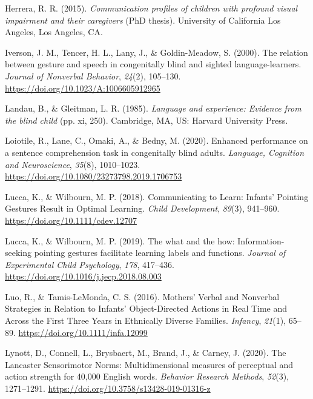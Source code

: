 \documentclass[
  man,floatsintext]{apa6}
\newlength{\cslhangindent}
\newlength{\cslentryspacingunit} %
\newenvironment{CSLReferences}[2] %
 {%
  \setlength{\parindent}{0pt}
  \ifodd #1
  \let\oldpar\par
  \def\par{\hangindent=\cslhangindent\oldpar}
  \fi
  \setlength{\parskip}{#2\cslentryspacingunit}
 }%
 {}
\begin{document}
\begin{CSLReferences}{1}{0}
\leavevmode{}%
Herrera, R. R. (2015). \emph{Communication profiles of children with profound visual impairment and their caregivers} (PhD thesis). University of California Los Angeles, {Los Angeles, CA}.

\leavevmode{}%
Iverson, J. M., Tencer, H. L., Lany, J., \& Goldin-Meadow, S. (2000). The relation between gesture and speech in congenitally blind and sighted language-learners. \emph{Journal of Nonverbal Behavior}, \emph{24}(2), 105--130. \url{https://doi.org/10.1023/A:1006605912965}

\leavevmode{}%
Landau, B., \& Gleitman, L. R. (1985). \emph{Language and experience: {Evidence} from the blind child} (pp. xi, 250). {Cambridge, MA, US}: {Harvard University Press}.

\leavevmode{}%
Loiotile, R., Lane, C., Omaki, A., \& Bedny, M. (2020). Enhanced performance on a sentence comprehension task in congenitally blind adults. \emph{Language, Cognition and Neuroscience}, \emph{35}(8), 1010--1023. \url{https://doi.org/10.1080/23273798.2019.1706753}

\leavevmode{}%
Lucca, K., \& Wilbourn, M. P. (2018). Communicating to {Learn}: {Infants}' {Pointing Gestures Result} in {Optimal Learning}. \emph{Child Development}, \emph{89}(3), 941--960. \url{https://doi.org/10.1111/cdev.12707}

\leavevmode{}%
Lucca, K., \& Wilbourn, M. P. (2019). The what and the how: {Information-seeking} pointing gestures facilitate learning labels and functions. \emph{Journal of Experimental Child Psychology}, \emph{178}, 417--436. \url{https://doi.org/10.1016/j.jecp.2018.08.003}

\leavevmode{}%
Luo, R., \& Tamis-LeMonda, C. S. (2016). Mothers' {Verbal} and {Nonverbal Strategies} in {Relation} to {Infants}' {Object-Directed Actions} in {Real Time} and {Across} the {First Three Years} in {Ethnically Diverse Families}. \emph{Infancy}, \emph{21}(1), 65--89. \url{https://doi.org/10.1111/infa.12099}

\leavevmode{}%
Lynott, D., Connell, L., Brysbaert, M., Brand, J., \& Carney, J. (2020). The {Lancaster Sensorimotor Norms}: Multidimensional measures of perceptual and action strength for 40,000 {English} words. \emph{Behavior Research Methods}, \emph{52}(3), 1271--1291. \url{https://doi.org/10.3758/s13428-019-01316-z}


\end{CSLReferences}
\end{document}
